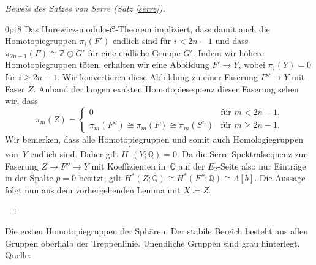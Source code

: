 \documentclass[11pt, a4paper, german]{article}
\theoremstyle{definition}
\theoremstyle{remark}
\newcommand{\Z}{\mathbb{Z}} %
\newcommand{\Q}{\mathbb{Q}} %
\newcommand{\SC}{\mathcal{C}} %
\begin{document}
\begin{proof}[Beweis des Satzes von Serre (Satz \ref{serre})]
\begin{cutout}{0}{\dimexpr\linewidth-5cm\relax}{0pt}{8}
    Das Hurewicz-modulo-$\SC$-Theorem impliziert, dass damit auch die Homotopiegruppen $\pi_i(F')$ endlich sind für $i < 2n-1$ und dass $\pi_{2n-1}(F) \cong \Z \oplus G'$ für eine endliche Gruppe $G'$.
    Indem wir höhere Homotopiegruppen töten, erhalten wir eine Abbildung $F' \to Y$, wobei $\pi_i(Y) = 0$ für $i \geq 2n-1$.
    Wir konvertieren diese Abbildung zu einer Faserung $F'' \to Y$ mit Faser $Z$.
    Anhand der langen exakten Homotopiesequenz dieser Faserung sehen wir, dass
    \[
      \pi_m(Z) = \begin{cases}
        0 & \text{für $m < 2n-1$,} \\
        \pi_m(F'') \cong \pi_m(F) \cong \pi_m(S^n) & \text{für $m \geq 2n-1$.}
      \end{cases}
    \]
    Wir bemerken, dass alle Homotopiegruppen und somit auch Homologiegruppen von~$Y$ endlich sind.
    Daher gilt $\widetilde{H}^*(Y; \Q) = 0$.
    Da die Serre-Spektralsequenz zur Faserung $Z \to F'' \to Y$ mit Koeffizienten in~$\Q$ auf der $E_2$-Seite also nur Einträge in der Spalte $p=0$ besitzt, gilt $H^*(Z; \Q) \cong H^*(F''; \Q) \cong \Lambda[b]$.
    Die Aussage folgt nun aus dem vorhergehenden Lemma mit $X \coloneqq Z$. \qedhere
  \end{cutout}
\end{proof}

\nocite{*}
\printbibliography

\newpage
{}
\begin{landscape}
  \begin{center}
    \mbox{}\vspace{8em}
    \begin{table}
      \footnotesize \setlength\extrarowheight{5pt}
      
      \caption{Die ersten Homotopiegruppen der Sphären. Der stabile Bereich besteht aus allen Gruppen oberhalb der Treppenlinie. Unendliche Gruppen sind grau hinterlegt. Quelle: \cite{toda:composition}}
    \end{table}
  \end{center}
\end{landscape}

\end{document}

